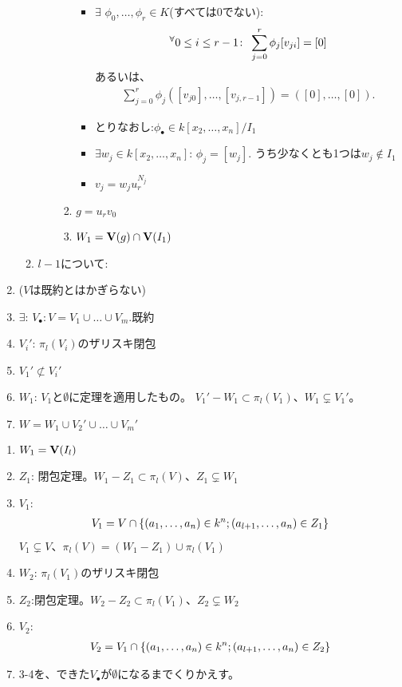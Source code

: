 \begin{enumerate}
\begin{enumerate}
\begin{enumerate}
\begin{enumerate}
\begin{itemize}
        \item $\exists$ $\phi_0,\dots,\phi_r \in K$(すべては0でない):
        \begin{align}
          {}^{\forall}{0\le i \le r-1}\mathrm{\colon\;} \sum_{j=0}^r \phi_j [v_{ji}] = [0]
        \end{align}
        あるいは、
        \begin{align}
          \sum_{j=0}^r \phi_j ([v_{j0}],\dots,[v_{j,r-1}]) = ([0],\dots, [0]).
        \end{align}
        \item
        とりなおし:$\phi_\bullet \in k[x_2,\dots,x_n]/I_1$
        \item
        $\exists w_j \in k[x_2,\dots,x_n]$: $\phi_j = [w_j]$.
        うち少なくとも1つは$w_j \notin I_1$
        \item
        $ v_j = w_j u_r^{N_j}$
      \end{itemize}
      \item $g=u_r v_0$
      \item $W_1 = \textbf V(g) \cap \textbf V(I_1)$
    \end{enumerate}
  \end{enumerate}
  \item $l-1$について:
  \end{enumerate}
  \item ($V$は既約とはかぎらない)
  \item $\exists$: $V_\bullet: V = V_1\cup \dots \cup V_m.$既約
  \item
  $V_i'$: $\pi_l(V_i)$のザリスキ閉包
  \item
  $V_1' \not\subset V_i'$
  \item
  $W_1$: $V_1$と$\emptyset$に定理を適用したもの。
  $V_1' - W_1 \subset \pi_l(V_1)$、$W_1 \subsetneq V_1'$。
  \item
  $W = W_1 \cup V_2' \cup \dots \cup V_m'$
\end{enumerate}

\begin{enumerate}
  \item $W_1 = \textbf V(I_l)$
  \item
  $Z_1$: 閉包定理。$W_1 - Z_1 \subset \pi_l(V)$、$Z_1 \subsetneq W_1$
  \item $V_1$:
  \begin{align}
    V_1 = V \cap \left\{(a_1,\dots,a_n)\in k^n; (a_{l+1},\dots,a_n)\in Z_1\right\}
  \end{align}
  $V_1 \subsetneq V$、$\pi_l(V) = (W_1-Z_1) \cup \pi_l(V_1)$
  \item
  $W_2$: $\pi_l(V_1)$のザリスキ閉包
  \item
  $Z_2$:閉包定理。$W_2 - Z_2 \subset \pi_l(V_1)$、$Z_2 \subsetneq W_2$
  \item
  $V_2$:
  \begin{align}
    V_2 = V_1 \cap \left\{(a_1,\dots,a_n)\in k^n; (a_{l+1},\dots,a_n)\in Z_2\right\}
  \end{align}
  \item
  3-4を、できた$V_\bullet$が$\emptyset$になるまでくりかえす。
\end{enumerate}

